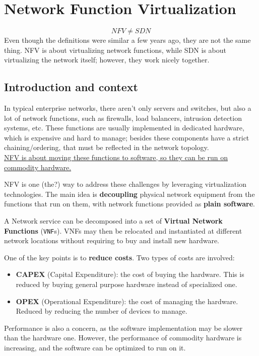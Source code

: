 \chapter{Network Function Virtualization}

\[
  NFV \neq SDN 
\]
Even though the definitions were similar a few years ago, they are not the same thing. NFV is about virtualizing network functions, while SDN is about virtualizing the network itself; however, they work nicely together.

\section{Introduction and context}
In typical enterprise networks, there aren't only servers and switches, but also a lot of network functions, such as firewalls, load balancers, intrusion detection systems, etc. These functions are usually implemented in dedicated hardware, which is expensive and hard to manage; besides these components have a strict chaining/ordering, that must be reflected in the network topology.\\
\ul{NFV is about moving these functions to software, so they can be run on commodity hardware.
}

NFV is one (the?) way to address these challenges by leveraging virtualization technologies. 
The main idea is \textbf{decoupling} physical network equipment from the functions that run on them, with network functions provided as \textbf{plain software}.

A Network service can be decomposed into a set of \textbf{Virtual Network Functions} (\texttt{VNF}s).
VNFs may then be relocated and instantiated at different network locations without requiring to buy and install new hardware.

One of the key points is to \textbf{reduce costs}. Two types of costs are involved:
\begin{itemize}
   \item \textbf{CAPEX} (Capital Expenditure): the cost of buying the hardware.
   This is reduced by buying general purpose hardware instead of specialized one.
   \item \textbf{OPEX} (Operational Expenditure): the cost of managing the hardware.
   Reduced by reducing the number of devices to manage.
\end{itemize}

Performance is also a concern, as the software implementation may be slower than the hardware one. However, the performance of commodity hardware is increasing, and the software can be optimized to run on it.


